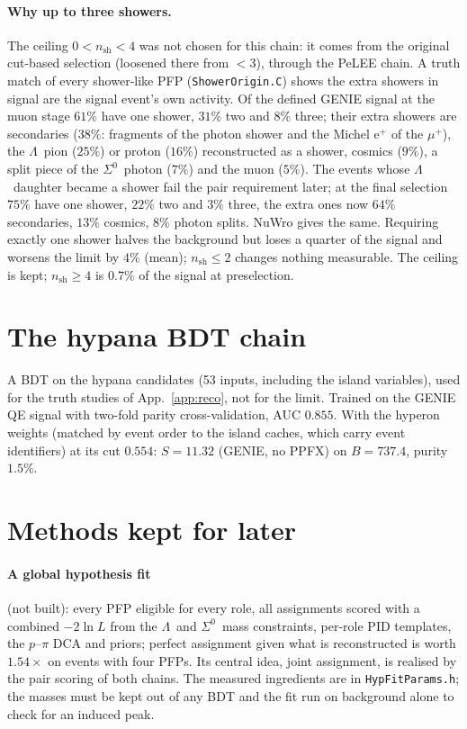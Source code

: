 \documentclass[11pt,a4paper]{article}
\newcommand{\Szero}{\ensuremath{\Sigma^{0}}}
\newcommand{\Lam}{\ensuremath{\Lambda}}
\begin{document}
\paragraph{Why up to three showers.} The ceiling $0<n_{\mathrm{sh}}<4$ was not chosen for this
chain: it comes from the original cut-based selection (loosened there from $<3$), through the
PeLEE chain. A truth match of every shower-like PFP (\texttt{ShowerOrigin.C}) shows the extra
showers in signal are the signal event's own activity. Of the defined GENIE signal at the muon
stage $61\%$ have one shower, $31\%$ two and $8\%$ three; their extra showers are secondaries
($38\%$: fragments of the photon shower and the Michel e$^+$ of the $\mu^+$), the \Lam\ pion
($25\%$) or proton ($16\%$) reconstructed as a shower, cosmics ($9\%$), a split piece of the
\Szero\ photon ($7\%$) and the muon ($5\%$). The events whose \Lam\ daughter became a shower
fail the pair requirement later; at the final selection $75\%$ have one shower, $22\%$ two and
$3\%$ three, the extra ones now $64\%$ secondaries, $13\%$ cosmics, $8\%$ photon splits. NuWro
gives the same. Requiring exactly one shower halves the background but loses a quarter of the
signal and worsens the limit by $4\%$ (mean); $n_{\mathrm{sh}}\leq2$ changes nothing measurable.
The ceiling is kept; $n_{\mathrm{sh}}\geq4$ is $0.7\%$ of the signal at preselection.

\section{The hypana BDT chain}
\label{app:hypbdt}
A BDT on the hypana candidates (53 inputs, including the island variables), used for the
truth studies of App.~\ref{app:reco}, not for the limit. Trained on the GENIE QE signal
with two-fold parity cross-validation, AUC $0.855$. With the hyperon weights (matched by
event order to the island caches, which carry event identifiers) at its cut $0.554$:
$S=11.32$ (GENIE, no PPFX) on $B=737.4$, purity $1.5\%$.

\section{Methods kept for later}
\label{app:misc}

\paragraph{A global hypothesis fit} (not built): every PFP eligible for every role, all
assignments scored with a combined $-2\ln L$ from the \Lam\ and \Szero\ mass constraints,
per-role PID templates, the $p$--$\pi$ DCA and priors; perfect assignment given what is
reconstructed is worth $1.54\times$ on events with four PFPs. Its central idea, joint
assignment, is realised by the pair scoring of both chains. The measured ingredients are in
\texttt{HypFitParams.h}; the masses must be kept out of any BDT and the fit run on
background alone to check for an induced peak.
\end{document}
